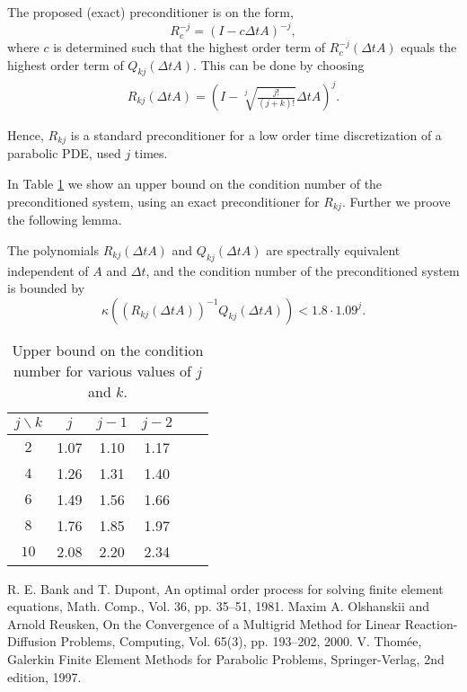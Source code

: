 \documentclass{report}
\begin{document}
The proposed (exact) preconditioner is on the form,
\[
R^{-j}_c = (I - c \Delta t A)^{-j},
\]
where $c$ is determined such that the highest order term of $R^{-j}_c(\Delta t A)$
equals the highest order term of $Q_{kj} (\Delta t A)$.
This can be done by choosing
\begin{eqnarray*}
R_{kj} (\Delta t A) =\left( I- \sqrt[j]{\frac {j!}{(j+k)!}}\Delta t A \right)^j.
\end{eqnarray*}

Hence, $R_{kj}$ is a standard preconditioner for a low
order time discretization of a parabolic PDE, used
$j$ times.

In Table \ref{cond} we show an upper bound on the condition
number of the preconditioned system, using an exact preconditioner
for $R_{kj}$. Further we proove the following lemma.

\begin{lemma}\label{lem1}
The polynomials $R_{kj}(\Delta t A)$ and $Q_{kj}(\Delta t A)$ are spectrally
equivalent independent of $A$ and $\Delta t$, and the condition number of
the preconditioned system is bounded by
\begin{equation*}
\kappa \left( \left( R_{kj}(\Delta t A) \right)^{-1} Q_{kj}(\Delta t
A) \right) < 1.8 \cdot 1.09^j.
\end{equation*}
\end{lemma}

\begin{table}
\begin{center}
\begin{tabular}{|c|c|c|c|c|c|}
\hline
$j\backslash k$& $j$ & $j-1$ & $j-2$ \\ \hline
$2$ & 1.07 & 1.10 & 1.17 \\ \hline
$4$ & 1.26 & 1.31 & 1.40 \\ \hline
$6$ & 1.49 & 1.56 & 1.66 \\ \hline
$8$ & 1.76 & 1.85 & 1.97 \\ \hline
$10$ & 2.08 & 2.20 & 2.34 \\ \hline
\end{tabular}
\end{center}
\caption{Upper bound on the condition number for various values of $j$ and $k$.}
\label{cond}
\end{table}

\begin{thebibliography}{99}
 R. E. Bank and T. Dupont, An optimal order process for
solving finite element equations, Math. Comp., Vol. 36, pp. 35--51, 1981.
 Maxim A. Olshanskii and Arnold
Reusken, On the Convergence of a Multigrid Method for Linear
Reaction-Diffusion Problems, Computing, Vol. 65(3), pp. 193--202, 2000.
 V. Thom\'{e}e, Galerkin Finite Element Methods for
Parabolic Problems, Springer-Verlag, 2nd edition, 1997.
\end{thebibliography}
\end{document}
